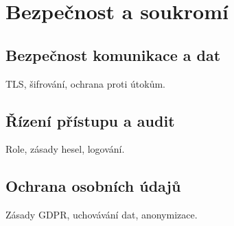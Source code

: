\chapter{Bezpečnost a soukromí}
\label{chap:bezpecnost}

\section{Bezpečnost komunikace a dat}
TLS, šifrování, ochrana proti útokům.

\section{Řízení přístupu a audit}
Role, zásady hesel, logování.

\section{Ochrana osobních údajů}
Zásady GDPR, uchovávání dat, anonymizace.
